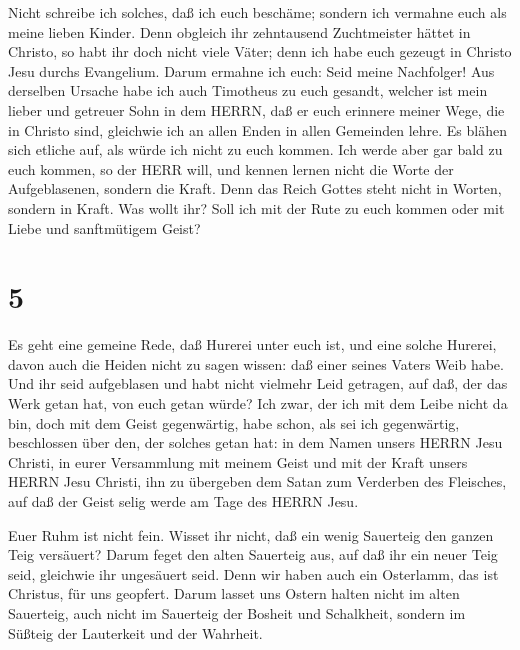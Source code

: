  Nicht schreibe ich solches, daß ich euch beschäme; sondern
ich vermahne euch als meine lieben Kinder.  Denn obgleich
ihr zehntausend Zuchtmeister hättet in Christo, so habt ihr doch nicht
viele Väter; denn ich habe euch gezeugt in Christo Jesu durchs
Evangelium.  Darum ermahne ich euch: Seid meine Nachfolger!
 Aus derselben Ursache habe ich auch Timotheus zu euch
gesandt, welcher ist mein lieber und getreuer Sohn in dem HERRN, daß er
euch erinnere meiner Wege, die in Christo sind, gleichwie ich an allen
Enden in allen Gemeinden lehre.  Es blähen sich etliche
auf, als würde ich nicht zu euch kommen.  Ich werde aber
gar bald zu euch kommen, so der HERR will, und kennen lernen nicht die
Worte der Aufgeblasenen, sondern die Kraft.  Denn das Reich
Gottes steht nicht in Worten, sondern in Kraft.  Was wollt
ihr? Soll ich mit der Rute zu euch kommen oder mit Liebe und
sanftmütigem Geist?

\hypertarget{section-4}{%
\section{5}\label{section-4}}

 Es geht eine gemeine Rede, daß Hurerei unter euch ist, und
eine solche Hurerei, davon auch die Heiden nicht zu sagen wissen: daß
einer seines Vaters Weib habe.  Und ihr seid aufgeblasen und
habt nicht vielmehr Leid getragen, auf daß, der das Werk getan hat, von
euch getan würde?  Ich zwar, der ich mit dem Leibe nicht da
bin, doch mit dem Geist gegenwärtig, habe schon, als sei ich
gegenwärtig, beschlossen über den, der solches getan hat: 
in dem Namen unsers HERRN Jesu Christi, in eurer Versammlung mit meinem
Geist und mit der Kraft unsers HERRN Jesu Christi,  ihn zu
übergeben dem Satan zum Verderben des Fleisches, auf daß der Geist selig
werde am Tage des HERRN Jesu.

 Euer Ruhm ist nicht fein. Wisset ihr nicht, daß ein wenig
Sauerteig den ganzen Teig versäuert?  Darum feget den alten
Sauerteig aus, auf daß ihr ein neuer Teig seid, gleichwie ihr ungesäuert
seid. Denn wir haben auch ein Osterlamm, das ist Christus, für uns
geopfert.  Darum lasset uns Ostern halten nicht im alten
Sauerteig, auch nicht im Sauerteig der Bosheit und Schalkheit, sondern
im Süßteig der Lauterkeit und der Wahrheit.


